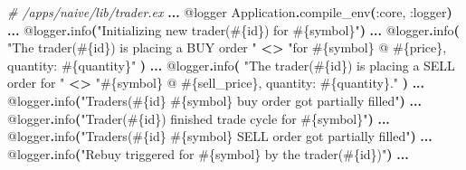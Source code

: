 \documentclass[
  oneside]{book}
\newenvironment{Shaded}{\begin{snugshade}}{\end{snugshade}}
\newcommand{\CommentTok}[1]{\textcolor[rgb]{0.56,0.35,0.01}{\textit{#1}}}
\newcommand{\ConstantTok}[1]{\textcolor[rgb]{0.56,0.35,0.01}{#1}}
\newcommand{\FunctionTok}[1]{\textcolor[rgb]{0.13,0.29,0.53}{\textbf{#1}}}
\newcommand{\NormalTok}[1]{#1}
\newcommand{\OperatorTok}[1]{\textcolor[rgb]{0.81,0.36,0.00}{\textbf{#1}}}
\newcommand{\OtherTok}[1]{\textcolor[rgb]{0.56,0.35,0.01}{#1}}
\newcommand{\StringTok}[1]{\textcolor[rgb]{0.31,0.60,0.02}{#1}}
\newcommand{\VariableTok}[1]{\textcolor[rgb]{0.00,0.00,0.00}{#1}}
\begin{document}
\begin{Shaded}
\begin{Highlighting}[]
\CommentTok{\# /apps/naive/lib/trader.ex}
  \OperatorTok{...}
  \OtherTok{@logger} \ConstantTok{Application}\OperatorTok{.}\NormalTok{compile\_env}\FunctionTok{(}\VariableTok{:core}\NormalTok{, }\VariableTok{:logger}\FunctionTok{)}
  \OperatorTok{...}
    \OtherTok{@logger}\OperatorTok{.}\NormalTok{info}\FunctionTok{(}\StringTok{"Initializing new trader(}\OtherTok{\#\{}\NormalTok{id}\OtherTok{\}}\StringTok{) for }\OtherTok{\#\{}\NormalTok{symbol}\OtherTok{\}}\StringTok{"}\FunctionTok{)}
  \OperatorTok{...}
    \OtherTok{@logger}\OperatorTok{.}\NormalTok{info}\FunctionTok{(}
      \StringTok{"The trader(}\OtherTok{\#\{}\NormalTok{id}\OtherTok{\}}\StringTok{) is placing a BUY order "} \OperatorTok{\textless{}\textgreater{}}
        \StringTok{"for }\OtherTok{\#\{}\NormalTok{symbol}\OtherTok{\}}\StringTok{ @ }\OtherTok{\#\{}\NormalTok{price}\OtherTok{\}}\StringTok{, quantity: }\OtherTok{\#\{}\NormalTok{quantity}\OtherTok{\}}\StringTok{"}
    \FunctionTok{)}
  \OperatorTok{...}
        \OtherTok{@logger}\OperatorTok{.}\NormalTok{info}\FunctionTok{(}
          \StringTok{"The trader(}\OtherTok{\#\{}\NormalTok{id}\OtherTok{\}}\StringTok{) is placing a SELL order for "} \OperatorTok{\textless{}\textgreater{}}
            \StringTok{"}\OtherTok{\#\{}\NormalTok{symbol}\OtherTok{\}}\StringTok{ @ }\OtherTok{\#\{}\NormalTok{sell\_price}\OtherTok{\}}\StringTok{, quantity: }\OtherTok{\#\{}\NormalTok{quantity}\OtherTok{\}}\StringTok{."}
        \FunctionTok{)}
  \OperatorTok{...}
        \OtherTok{@logger}\OperatorTok{.}\NormalTok{info}\FunctionTok{(}\StringTok{"Trader\textquotesingle{}s(}\OtherTok{\#\{}\NormalTok{id}\OtherTok{\}}\StringTok{ }\OtherTok{\#\{}\NormalTok{symbol}\OtherTok{\}}\StringTok{ buy order got partially filled"}\FunctionTok{)}
  \OperatorTok{...}
      \OtherTok{@logger}\OperatorTok{.}\NormalTok{info}\FunctionTok{(}\StringTok{"Trader(}\OtherTok{\#\{}\NormalTok{id}\OtherTok{\}}\StringTok{) finished trade cycle for }\OtherTok{\#\{}\NormalTok{symbol}\OtherTok{\}}\StringTok{"}\FunctionTok{)}
  \OperatorTok{...}
      \OtherTok{@logger}\OperatorTok{.}\NormalTok{info}\FunctionTok{(}\StringTok{"Trader\textquotesingle{}s(}\OtherTok{\#\{}\NormalTok{id}\OtherTok{\}}\StringTok{ }\OtherTok{\#\{}\NormalTok{symbol}\OtherTok{\}}\StringTok{ SELL order got partially filled"}\FunctionTok{)}
  \OperatorTok{...}
      \OtherTok{@logger}\OperatorTok{.}\NormalTok{info}\FunctionTok{(}\StringTok{"Rebuy triggered for }\OtherTok{\#\{}\NormalTok{symbol}\OtherTok{\}}\StringTok{ by the trader(}\OtherTok{\#\{}\NormalTok{id}\OtherTok{\}}\StringTok{)"}\FunctionTok{)}
  \OperatorTok{...}
\end{Highlighting}
\end{Shaded}
\end{document}
